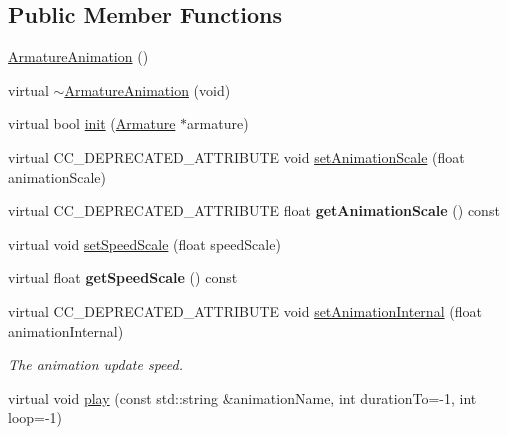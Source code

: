 \subsection*{Public Member Functions}
\begin{DoxyCompactItemize}
\item 
\hyperlink{classcocostudio_1_1ArmatureAnimation_a9cef53f1f3dabb3023fe2495fc293662}{Armature\+Animation} ()
\item 
virtual \hyperlink{classcocostudio_1_1ArmatureAnimation_a4f27f6342b5d63281418eab3d9564711}{$\sim$\+Armature\+Animation} (void)
\item 
virtual bool \hyperlink{classcocostudio_1_1ArmatureAnimation_a678f0d6943b3ca51590a97f83b2f7ebf}{init} (\hyperlink{classcocostudio_1_1Armature}{Armature} $\ast$armature)
\item 
virtual C\+C\+\_\+\+D\+E\+P\+R\+E\+C\+A\+T\+E\+D\+\_\+\+A\+T\+T\+R\+I\+B\+U\+TE void \hyperlink{classcocostudio_1_1ArmatureAnimation_aaa34e04e1033bd408fb48c27e22e1e61}{set\+Animation\+Scale} (float animation\+Scale)
\item 
\mbox{\label{classcocostudio_1_1ArmatureAnimation_a7dd8d361fcf6ebfd36ae37ea1ba06241}} 
virtual C\+C\+\_\+\+D\+E\+P\+R\+E\+C\+A\+T\+E\+D\+\_\+\+A\+T\+T\+R\+I\+B\+U\+TE float {\bfseries get\+Animation\+Scale} () const
\item 
virtual void \hyperlink{classcocostudio_1_1ArmatureAnimation_ae642ac47eda15afa351247aa304b852f}{set\+Speed\+Scale} (float speed\+Scale)
\item 
\mbox{\label{classcocostudio_1_1ArmatureAnimation_ae55ab5c1e16a3eae8cb473c1acd37b78}} 
virtual float {\bfseries get\+Speed\+Scale} () const
\item 
\mbox{\label{classcocostudio_1_1ArmatureAnimation_addff1b98a0343d8afff91ec2244940a1}} 
virtual C\+C\+\_\+\+D\+E\+P\+R\+E\+C\+A\+T\+E\+D\+\_\+\+A\+T\+T\+R\+I\+B\+U\+TE void \hyperlink{classcocostudio_1_1ArmatureAnimation_addff1b98a0343d8afff91ec2244940a1}{set\+Animation\+Internal} (float animation\+Internal)
\begin{DoxyCompactList}\small\item\em The animation update speed. \end{DoxyCompactList}\item 
virtual void \hyperlink{classcocostudio_1_1ArmatureAnimation_a2a9e3d20b2bf2df20687106e8d44dc3c}{play} (const std\+::string \&animation\+Name, int duration\+To=-\/1, int loop=-\/1)

\end{DoxyCompactItemize}
